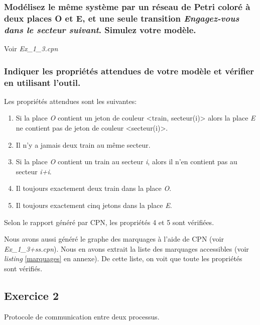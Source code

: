 \documentclass[french]{article}
\begin{document}
\subsubsection{Modélisez le même système par un réseau de Petri coloré à deux places O et E, et une seule transition
  \textit{Engagez-vous dans le secteur suivant}. Simulez votre modèle.}
Voir \textit{Ex\_1\_3.cpn} \\



\subsubsection{Indiquer les propriétés attendues de votre modèle et vérifier en utilisant l’outil.}
Les propriétés attendues sont les suivantes:
\begin{enumerate}
\item Si la place \textit{O} contient un jeton de couleur <train, secteur(i)> alors la place \textit{E} ne contient pas de jeton de couleur <secteur(i)>.
\item Il n'y a jamais deux train au même secteur.
\item Si la place \textit{O} contient un train au secteur \textit{i}, alors il n'en contient pas au secteur \textit{i+i}.
\item Il toujours exactement deux train dans la place \textit{O}.
\item Il toujours exactement cinq jetons dans la place \textit{E}.
\end{enumerate} 

\par{Selon le rapport généré par CPN, les propriétés 4 et 5 sont vérifiées.}



\par{Nous avons aussi généré le graphe des marquages à l'aide de CPN (voir \textit{Ex\_1\_3+ss.cpn}). Nous en avons extrait la liste des marquages accessibles (voir \textit{listing} \ref{marquages} en annexe). De cette liste, on voit que toute les propriétés sont vérifiés.}



\subsection{Exercice 2}
Protocole de communication entre deux processus.
\end{document}
